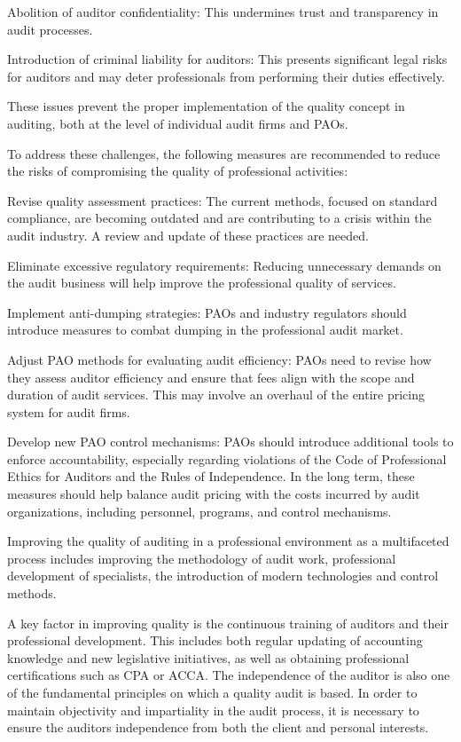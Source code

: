Abolition of auditor confidentiality: This undermines trust and
transparency in audit processes.

Introduction of criminal liability for auditors: This presents
significant legal risks for auditors and may deter professionals from
performing their duties effectively.

These issues prevent the proper implementation of the quality concept in
auditing, both at the level of individual audit firms and PAOs.

To address these challenges, the following measures are recommended to
reduce the risks of compromising the quality of professional activities:

Revise quality assessment practices: The current methods, focused on
standard compliance, are becoming outdated and are contributing to a
crisis within the audit industry. A review and update of these practices
are needed.

Eliminate excessive regulatory requirements: Reducing unnecessary
demands on the audit business will help improve the professional quality
of services.

Implement anti-dumping strategies: PAOs and industry regulators should
introduce measures to combat dumping in the professional audit market.

Adjust PAO methods for evaluating audit efficiency: PAOs need to revise
how they assess auditor efficiency and ensure that fees align with the
scope and duration of audit services. This may involve an overhaul of
the entire pricing system for audit firms.

Develop new PAO control mechanisms: PAOs should introduce additional
tools to enforce accountability, especially regarding violations of the
Code of Professional Ethics for Auditors and the Rules of Independence.
In the long term, these measures should help balance audit pricing with
the costs incurred by audit organizations, including personnel,
programs, and control mechanisms.

Improving the quality of auditing in a professional environment as a
multifaceted process includes improving the methodology of audit work,
professional development of specialists, the introduction of modern
technologies and control methods.

A key factor in improving quality is the continuous training of auditors
and their professional development. This includes both regular updating
of accounting knowledge and new legislative initiatives, as well as
obtaining professional certifications such as CPA or ACCA. The
independence of the auditor is also one of the fundamental principles on
which a quality audit is based. In order to maintain objectivity and
impartiality in the audit process, it is necessary to ensure the
auditor\textquotesingle s independence from both the client and personal
interests.

